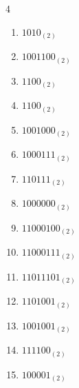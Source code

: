 \begin{multicols}{4}
\begin{enumerate}
        \phantom{$=167$}

  \item $1010_{(2)}$

        \phantom{$=10$}

\columnbreak %

  \item $1001100_{(2)}$

        \phantom{$=76$}

  \item $1100_{(2)}$

        \phantom{$=12$}

  \item $1100_{(2)}$

        \phantom{$=12$}

  \item $1001000_{(2)}$

        \phantom{$=72$}

  \item $1000111_{(2)}$

        \phantom{$=71$}

  \item $110111_{(2)}$

        \phantom{$=55$}

  \item $1000000_{(2)}$

        \phantom{$=64$}

  \item $11000100_{(2)}$

        \phantom{$=196$}

  \item $11000111_{(2)}$

        \phantom{$=199$}

  \item $11011101_{(2)}$

        \phantom{$=221$}

  \item $1101001_{(2)}$

        \phantom{$=105$}

  \item $1001001_{(2)}$

        \phantom{$=73$}

  \item $111100_{(2)}$

        \phantom{$=60$}

  \item $100001_{(2)}$


\end{enumerate}
\end{multicols}
